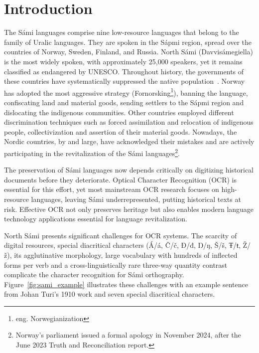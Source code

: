 \documentclass[conference]{IEEEtran}
\newcommand{\smiSpeakers}{25,000}
\begin{document}
\section{Introduction}
\label{sec:introduction}

The S\'{a}mi languages comprise nine low-resource languages that belong to the family of Uralic languages. They are spoken in the S\'{a}pmi region, spread over the countries of Norway, Sweden, Finland, and Russia. 
North S\'{a}mi (Davvis\'{a}megiella) is the most widely spoken, with approximately \smiSpeakers{} speakers, yet it remains classified as endangered by UNESCO.
Throughout history, the governments of these countries have systematically suppressed the native population~\cite{minde2003}. Norway has adopted the most aggressive strategy (Fornorsking\footnote{eng. Norwegianization}), banning the language, confiscating land and material goods, sending settlers to the S\'{a}pmi region and dislocating the indigenous communities. Other countries employed different discrimination techniques such as forced assimilation and relocation of indigenous people, collectivization and assertion of their material goods. 
Nowadays, the Nordic countries, by and large, have acknowledged their mistakes and are actively participating in the revitalization of the S\'{a}mi languages\footnote{Norway's parliament issued a formal apology in November 2024, after the June 2023 Truth and Reconciliation report.}. 

The preservation of S\'{a}mi languages now depends critically on digitizing historical documents before they deteriorate.
Optical Character Recognition (OCR) is essential for this effort, yet most mainstream OCR research focuses on high-resource languages, leaving S\'{a}mi underrepresented, putting historical texts at risk.
Effective OCR not only preserves heritage but also enables modern language technology applications essential for language revitalization. 

North S\'{a}mi presents significant challenges for OCR systems.
The scarcity of digital resources, special diacritical characters (\'{A}/\'{a}, \v{C}/\v{c}, Đ/đ, Ŋ/ŋ, \v{S}/\v{s}, Ŧ/ŧ, \v{Z}/\v{z}), its agglutinative morphology, large vocabulary with hundreds of inflected forms per verb and a cross-linguistically rare three-way quantity contrast complicate the character recognition for S\'{a}mi orthography. Figure~\ref{fig:sami_example} illustrates these challenges with an example sentence from Johan Turi's 1910 work and seven special diacritical characters.
\end{document}
